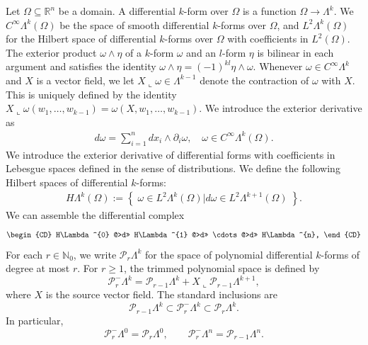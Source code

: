 \documentclass{article}
\begin{document}
Let $\Omega \subseteq \mathbb R^n$ be a domain.
A differential $k$-form over $\Omega$ is a function $\Omega \rightarrow \Lambda^k$.
We $C^{\infty}\Lambda^{k}(\Omega)$ be the space of smooth differential $k$-forms over $\Omega$, and $L^{2}\Lambda^{k}(\Omega)$ for the Hilbert space of differential $k$-forms over $\Omega$ with coefficients in $L^2(\Omega)$.
The exterior product $\omega \wedge \eta$ of a $k$-form $\omega$ and an $l$-form $\eta$ is bilinear in each argument and satisfies the identity $\omega \wedge \eta = (-1)^{kl} \eta \wedge \omega$.
Whenever $\omega \in C^{\infty}\Lambda^k$ and $X$ is a vector field,
we let $X \llcorner \omega \in \Lambda^{k-1}$ denote the contraction of $\omega$ with $X$. This is uniquely defined by the identity
$X \llcorner \omega( w_1, \ldots, w_{k-1} ) = \omega( X, w_1, \ldots, w_{k-1} )$.
We introduce the exterior derivative as
\begin{align}
	d\omega = \sum_{i=1}^{n} d x_{i} \wedge \partial_{i} \omega,
	\quad
	\omega \in C^{\infty}\Lambda^{k}(\Omega).
\end{align}
We introduce the exterior derivative of differential forms with coefficients in Lebesgue spaces defined in the sense of distributions.
We define the following Hilbert spaces of differential $k$-forms:
\begin{align}
	H\Lambda^{k}(\Omega)
	:=
	\left\{\;
	\omega \in L^{2}\Lambda^{k}(\Omega)
	\big|
	d\omega \in L^{2}\Lambda^{k+1}(\Omega)
	\;\right\}
	.
\end{align}
We can assemble the differential complex
\begin{align}
	\begin{CD}
		H\Lambda^{0}
		@>d>>
		H\Lambda^{1}
		@>d>>
		\cdots
		@>d>>
		H\Lambda^{n},
	\end{CD}
\end{align}
For each $r\in\mathbb N_0$, we write
$\mathcal P_r\Lambda^k$ for the space of polynomial differential
$k$-forms of degree at most $r$. For $r\geq1$, the trimmed polynomial
space is defined by
\[
\mathcal P_r^{-}\Lambda^k
=
\mathcal P_{r-1}\Lambda^k
+
X\llcorner\mathcal P_{r-1}\Lambda^{k+1},
\]
where $X$ is the source vector field. The standard inclusions are
\[
\mathcal P_{r-1}\Lambda^k
\subset
\mathcal P_r^{-}\Lambda^k
\subset
\mathcal P_r\Lambda^k.
\]
In particular,
\[
\mathcal P_r^{-}\Lambda^0
=
\mathcal P_r\Lambda^0,
\qquad
\mathcal P_r^{-}\Lambda^n
=
\mathcal P_{r-1}\Lambda^n.
\]
\end{document}

